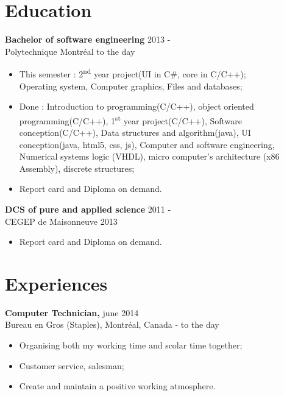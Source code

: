 \documentclass[margin]{res}
\begin{document}
\begin{resume}

  \section{Education}
  
  {\bf Bachelor of software engineering } \hfill 2013 -\\ 
  Polytechnique Montr\'{e}al \hfill to the day
  \begin{itemize} \itemsep -2pt
  \item This semester : 2\textsuperscript{nd} year project(UI in C\#, core in C/C++); \\ Operating system, Computer graphics, Files and databases;
  \item Done : Introduction to programming(C/C++), object oriented programming(C/C++), 1\textsuperscript{st} year project(C/C++), Software conception(C/C++), Data structures and algorithm(java), UI conception(java, html5, css, js), Computer and software engineering, Numerical systems logic (VHDL), micro computer’s architecture (x86 Assembly), discrete structures;
  \item Report card and Diploma on demand.
  \end{itemize}
  
  
  {\bf DCS of pure and applied science} \hfill 2011 -\\
  CEGEP de Maisonneuve \hfill 2013
  \begin{itemize} \itemsep -2pt
   \item Report card and Diploma on demand.
  \end{itemize}


  
  \section{Experiences}
  
  {\bf Computer Technician,} \hfill june 2014 \\
  Bureau en Gros (Staples), Montr\'{e}al, Canada  \hfill - to the day
  \begin{itemize} \itemsep -2pt  %
  \item Organising both my working time and scolar time together; 
  \item Customer service, salesman;
  \item Create and maintain a positive working atmosphere.
  \end{itemize}
  

\end{resume}
\end{document}
